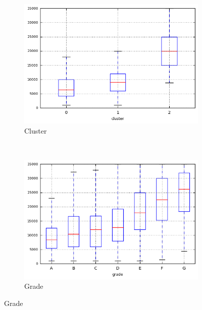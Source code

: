 \begin{figure}[!ht]
    \centering
        \caption{\emph{Boxplots} de funded\textunderscore amnt }
        \begin{subfigure}[t]{0.45\textwidth}
            \centering
            \caption{Cluster }

            \centerline{\includegraphics[width=1\textwidth]{img/funded_amnt_by_cluster}}
        \end{subfigure}%
        ~ 
        \begin{subfigure}[t]{0.45\textwidth}
            \centering
            \caption{Grade }
   
            \centerline{\includegraphics[width=1\textwidth]{img/funded_amnt_by_grade}}

        \end{subfigure}
\end{figure}

